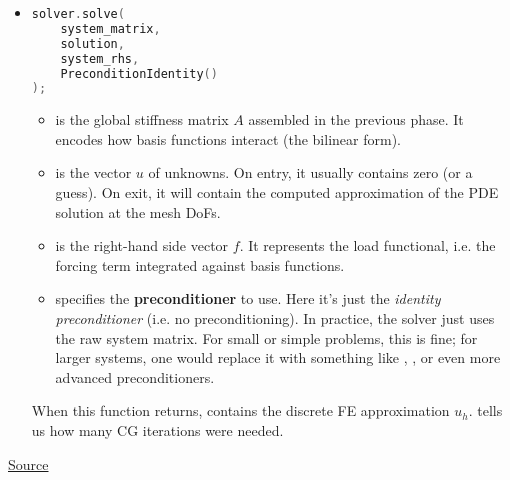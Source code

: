\begin{itemize}
    \item {}
    \begin{lstlisting}[language=C++]
solver.solve(
    system_matrix,
    solution,
    system_rhs,
    PreconditionIdentity()
);\end{lstlisting}
    \begin{itemize}
        \item {} is the global stiffness matrix $A$ assembled in the previous phase. It encodes how basis functions interact (the bilinear form).
        \item {} is the vector $u$ of unknowns. On entry, it usually contains zero (or a guess). On exit, it will contain the computed approximation of the PDE solution at the mesh DoFs.
        \item {} is the right-hand side vector $f$. It represents the load functional, i.e. the forcing term integrated against basis functions.
        \item {} specifies the \textbf{preconditioner} to use. Here it's just the \emph{identity preconditioner} (i.e. no preconditioning). In practice, the solver just uses the raw system matrix. For small or simple problems, this is fine; for larger systems, one would replace it with something like , , or even more advanced preconditioners.
    \end{itemize}
    When this function returns,  contains the discrete FE approximation $u_{h}$.  tells us how many CG iterations were needed.
\end{itemize}

\begin{center}
    \href{https://gist.github.com/AndreVale69/f04f312da68d16c253f46493ae7eaf24#file-poisson1d-cpp}{ Source}
    \hspace{1em}
\end{center}